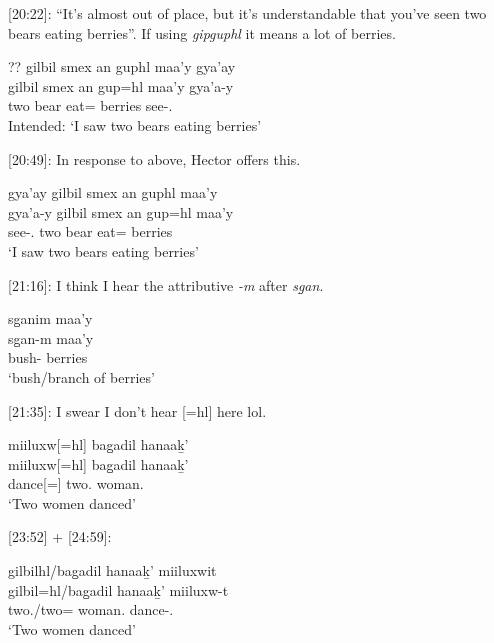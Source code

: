 [20:22]: ``It's almost out of place, but it's understandable that you've seen two bears eating berries''. If using \textit{gipguphl} it means a lot of berries.

\begin{exe}
    \ex \glll ?? gilbil smex an guphl maa'y gya'ay \\
    {} gilbil smex an gup=hl maa'y gya'a-y \\
    {} two bear \Ax{} eat=\Cn{} berries see-\Ssg{}.\Ii{} \\
    Intended: `I saw two bears eating berries'    
\end{exe}

[20:49]: In response to above, Hector offers this. 

\begin{exe}
    \ex \glll gya'ay gilbil smex an guphl maa'y \\
    gya'a-y gilbil smex an gup=hl maa'y \\
    see-\Ssg{}.\Ii{} two bear \Ax{} eat=\Cn{} berries \\
    `I saw two bears eating berries'    
\end{exe}

[21:16]: I think I hear the attributive \textit{-m} after \textit{sg̱an}.

\begin{exe}
    \ex \glll sg̱anim maa'y \\
    sg̱an-m maa'y \\
    bush-\Attr{} berries \\
    `bush/branch of berries'    
\end{exe}

[21:35]:  I swear I don't hear [=hl] here lol.

\begin{exe}
    \ex \glll miiluxw[=hl] bag̱adil hanaaḵ' \\
    miiluxw[=hl] bag̱adil hanaaḵ' \\
    dance[=\Cn{}] two.\Hum{} woman.\Pl{} \\
    `Two women danced'
\end{exe}

    
[23:52] + [24:59]: 

\begin{exe}
    \ex \glll gilbilhl/bag̱adil hanaaḵ' miiluxwit  \\
    gilbil=hl/bag̱adil hanaaḵ' miiluxw-t \\
    two.\Hum{}/two=\Cn{} woman.\Pl{} dance-\Tsg{}.\Ii{}  \\
    `Two women danced'
\end{exe}

